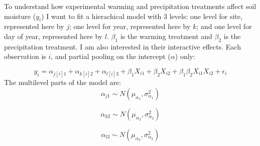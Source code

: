 \documentclass[12pt,a4paper]{article}
\begin{document}
\noindent To understand how experimental warming and precipitation treatments affect soil moisture ($y_{i}$) I want to fit a hierachical model with 3 levels: one level for site, represented here by $j$; one level for year, represented here by $k$; and one level for day of year, represented here by $l$. $\beta_{1}$ is the warming treatment and $\beta_{2}$ is the precipitation treatment.  I am also interested in their interactive effects. Each observation is $i$, and partial pooling on the intercept ($\alpha$) only:


\begin{equation}
y_{i}=\alpha_{j[i]1}+\alpha_{k[i]2}+\alpha_{l[i]3}+\beta_{1}X_{i1}+\beta_{2}X_{i2}+\beta_{1}\beta_{2}X_{i1}X_{i2}+\epsilon_{i}
\end{equation}
The multilevel parts of the model are:
\begin{equation}
\alpha_{j1} \sim N(\mu_{\alpha_1}, \sigma^{2}_{\alpha_1})
\end{equation}

\begin{equation}
\alpha_{k2} \sim N(\mu_{\alpha_2}, \sigma^{2}_{\alpha_2})
\end{equation}

\begin{equation}
\alpha_{l3} \sim N(\mu_{\alpha_3}, \sigma^{2}_{\alpha_3})
\end{equation}
\end{document}
